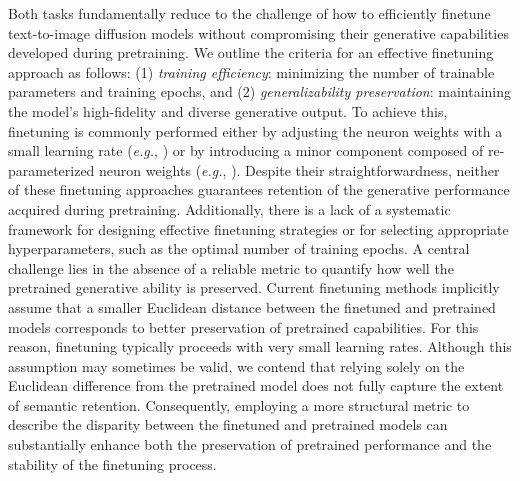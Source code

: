 Both tasks fundamentally reduce to the challenge of how to efficiently finetune text-to-image diffusion models without compromising their generative capabilities developed during pretraining. We outline the criteria for an effective finetuning approach as follows: (1) \emph{training efficiency}: minimizing the number of trainable parameters and training epochs, and (2) \emph{generalizability preservation}: maintaining the model’s high-fidelity and diverse generative output. To achieve this, finetuning is commonly performed either by adjusting the neuron weights with a small learning rate (\emph{e.g.}, \cite{ruiz2023dreambooth}) or by introducing a minor component composed of re-parameterized neuron weights (\emph{e.g.}, \cite{hulora2022,zhang2023adding}). Despite their straightforwardness, neither of these finetuning approaches guarantees retention of the generative performance acquired during pretraining. Additionally, there is a lack of a systematic framework for designing effective finetuning strategies or for selecting appropriate hyperparameters, such as the optimal number of training epochs. A central challenge lies in the absence of a reliable metric to quantify how well the pretrained generative ability is preserved. Current finetuning methods implicitly assume that a smaller Euclidean distance between the finetuned and pretrained models corresponds to better preservation of pretrained capabilities. For this reason, finetuning typically proceeds with very small learning rates. Although this assumption may sometimes be valid, we contend that relying solely on the Euclidean difference from the pretrained model does not fully capture the extent of semantic retention. Consequently, employing a more structural metric to describe the disparity between the finetuned and pretrained models can substantially enhance both the preservation of pretrained performance and the stability of the finetuning process.

